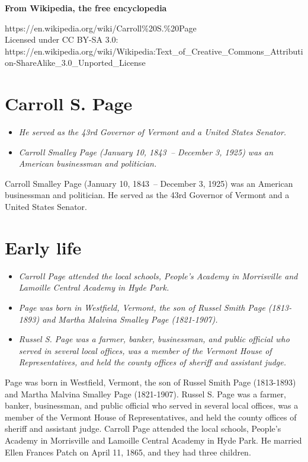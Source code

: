 \textbf{From Wikipedia, the free encyclopedia}

https://en.wikipedia.org/wiki/Carroll\%20S.\%20Page\\
Licensed under CC BY-SA 3.0:\\
https://en.wikipedia.org/wiki/Wikipedia:Text\_of\_Creative\_Commons\_Attribution-ShareAlike\_3.0\_Unported\_License

\section{Carroll S. Page}\label{carroll-s.-page}

\begin{itemize}
\item
  \emph{He served as the 43rd Governor of Vermont and a United States
  Senator.}
\item
  \emph{Carroll Smalley Page (January 10, 1843~-- December 3, 1925) was
  an American businessman and politician.}
\end{itemize}

Carroll Smalley Page (January 10, 1843~-- December 3, 1925) was an
American businessman and politician. He served as the 43rd Governor of
Vermont and a United States Senator.

\section{Early life}\label{early-life}

\begin{itemize}
\item
  \emph{Carroll Page attended the local schools, People's Academy in
  Morrisville and Lamoille Central Academy in Hyde Park.}
\item
  \emph{Page was born in Westfield, Vermont, the son of Russel Smith
  Page (1813-1893) and Martha Malvina Smalley Page (1821-1907).}
\item
  \emph{Russel S. Page was a farmer, banker, businessman, and public
  official who served in several local offices, was a member of the
  Vermont House of Representatives, and held the county offices of
  sheriff and assistant judge.}
\end{itemize}

Page was born in Westfield, Vermont, the son of Russel Smith Page
(1813-1893) and Martha Malvina Smalley Page (1821-1907). Russel S. Page
was a farmer, banker, businessman, and public official who served in
several local offices, was a member of the Vermont House of
Representatives, and held the county offices of sheriff and assistant
judge. Carroll Page attended the local schools, People's Academy in
Morrisville and Lamoille Central Academy in Hyde Park. He married Ellen
Frances Patch on April 11, 1865, and they had three children.

